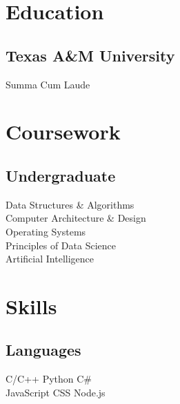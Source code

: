 \documentclass[]{resume-openfont}
\begin{document}
\begin{minipage}[t]{1\textwidth} 
\begin{multicols}{3}

    \section{\Large Education} 
    \subsection{Texas A\&M University}
    Summa Cum Laude\\
    \sectionsep
    
    \vfill\null
    \columnbreak


    
    \section{\Large Coursework}
    \subsection{Undergraduate}
    Data Structures \& Algorithms \\
    Computer Architecture \& Design \\
    Operating Systems \\
    Principles of Data Science \\
    Artificial Intelligence \\
    \sectionsep

    \vfill\null
    \columnbreak

    \section{\Large Skills}
    \subsection{ Languages}
    C/C++ \textbullet{} Python \textbullet{} C\# \\
    JavaScript \textbullet{} CSS \textbullet{} Node.js\\

\end{multicols}
\end{minipage}
\end{document}
